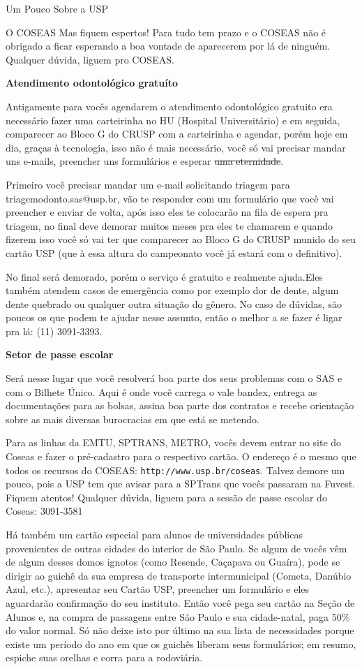 \begin{secao}{Um Pouco Sobre a USP}
\begin{subsecao}{O COSEAS}
Mas fiquem espertos! Para tudo tem prazo e o COSEAS não é obrigado a ficar esperando a
boa vontade de aparecerem por lá de ninguém. Qualquer dúvida, liguem pro COSEAS.

{\bf Atendimento odontológico gratuíto}

Antigamente para vocês agendarem o atendimento odontológico gratuito era necessário fazer uma
carteirinha no HU (Hospital Universitário) e em seguida, comparecer ao Bloco G
do CRUSP com a carteirinha e agendar, porém hoje em dia, graças à tecnologia,
isso não é mais necessário, você só vai precisar mandar uns e-mails, preencher uns
formulários e esperar \sout{uma eternidade}.

Primeiro você precisar mandar um e-mail solicitando triagem para triagemodonto.sas@usp.br,
vão te responder com um formulário que você vai preencher e enviar de volta, após isso eles
te colocarão na fila de espera pra triagem, no final deve demorar muitos meses pra
eles te chamarem e quando fizerem isso você só vai ter que comparecer ao Bloco G do CRUSP
munido do seu cartão USP (que à essa altura do campeonato você já estará com o definitivo).

No final será demorado, porém o serviço é gratuito e realmente ajuda.Eles também atendem casos
de emergência como por exemplo dor de dente, algum dente quebrado ou qualquer outra situação
do gênero. No caso de dúvidas, são poucos os que podem te ajudar nesse assunto, então o melhor
a se fazer é ligar pra lá: (11) 3091-3393.


{\bf Setor de passe escolar}

Será nesse lugar que você resolverá boa parte dos seus problemas com o SAS e com o
Bilhete Único. Aqui é onde você carrega o vale bandex, entrega as documentações para
as bolsas, assina boa parte dos contratos e recebe orientação sobre as mais diversas
burocracias em que está se metendo.

Para as linhas da EMTU, SPTRANS, METRO, vocês devem entrar no site do Coseas e fazer
o pré-cadastro para o respectivo cartão. O endereço é o mesmo que todos os recursos
do COSEAS: {\tt http://www.usp.br/coseas}. Talvez demore um pouco, pois a USP tem que
avisar para a SPTrans que vocês passaram na Fuvest. Fiquem atentos! Qualquer dúvida,
liguem para a sessão de passe escolar do Coseas: 3091-3581

Há também um cartão especial para alunos de universidades públicas provenientes
de outras cidades do interior de São Paulo. Se algum de vocês vêm de algum desses domos
ignotos (como Resende, Caçapava ou Guaíra), pode se dirigir ao guichê da sua empresa de
transporte intermunicipal (Cometa, Danúbio Azul, etc.), apresentar seu Cartão USP,
preencher um formulário e eles aguardarão confirmação do seu instituto. Então
você pega seu cartão na Seção de Alunos e, na compra de passagens entre São Paulo
e sua cidade-natal, paga 50\% do valor normal. Só não deixe isto por último na
sua lista de necessidades porque existe um período do ano em que os guichês
liberam seus formulários; em resumo, espiche suas orelhas e corra para a rodoviária.


\end{subsecao}
\end{secao}
